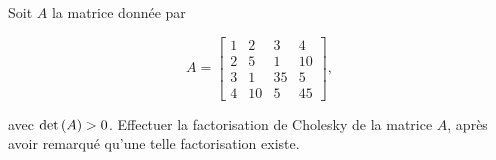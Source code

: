 Soit $A$ la matrice donnée par

\begin{equation*}
  A = \begin{bmatrix}
        1  & 2  & 3  & 4  \\
        2  & 5  & 1  & 10  \\
        3  & 1  & 35 & 5  \\
        4  & 10 & 5  & 45 
      \end{bmatrix}
      ,
\end{equation*}

avec $\det \left(A\right) > 0$.
Effectuer la factorisation de Cholesky de la matrice $A$, après avoir remarqué qu'une telle factorisation existe.
